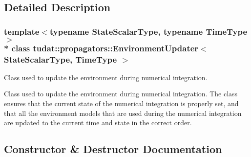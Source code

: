 \subsection{Detailed Description}
\subsubsection*{template$<$typename State\+Scalar\+Type, typename Time\+Type$>$\\*
class tudat\+::propagators\+::\+Environment\+Updater$<$ State\+Scalar\+Type, Time\+Type $>$}

Class used to update the environment during numerical integration. 

Class used to update the environment during numerical integration. The class ensures that the current state of the numerical integration is properly set, and that all the environment models that are used during the numerical integration are updated to the current time and state in the correct order. 

\subsection{Constructor \& Destructor Documentation}

